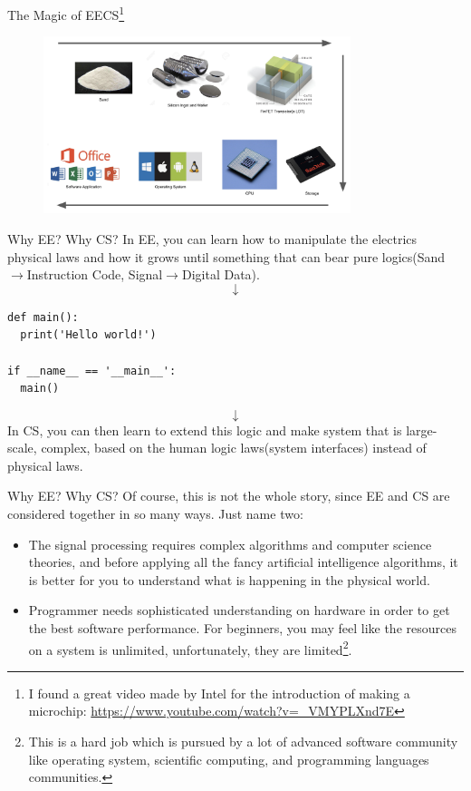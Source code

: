 \documentclass[aspectratio=169, 12pt]{beamer}
\begin{document}
\begin{frame}{The Magic of EECS\footnote{\tiny I found a great video made by Intel for the introduction of making a microchip: \url{https://www.youtube.com/watch?v=_VMYPLXnd7E}}}
    \begin{figure}
        \centering
        \includegraphics[width=0.8\textwidth]{assets/magic.png}
        \label{fig:magic}
    \end{figure}
\end{frame}

\begin{frame}[fragile]{Why EE? Why CS?}
In EE, you can learn how to manipulate the electrics physical laws and how it grows until something that can bear pure logics(Sand$\rightarrow$Instruction Code, Signal$\rightarrow$Digital Data).
$$\downarrow$$
\begin{lstlisting}[upquote=true]
def main():
  print('Hello world!')

if __name__ == '__main__':
  main()
\end{lstlisting}
$$\downarrow$$
In CS, you can then learn to extend this logic and make system that is large-scale, complex, based on the human logic laws(system interfaces) instead of physical laws.
\end{frame}

\begin{frame}{Why EE? Why CS?}
Of course, this is not the whole story, since EE and CS are considered together in so many ways. Just name two:
\begin{itemize}
\item The signal processing requires complex algorithms and computer science theories, and before applying all the fancy artificial intelligence algorithms, it is better for you to understand what is happening in the physical world.
\item Programmer needs sophisticated understanding on hardware in order to get the best software performance. For beginners, you may feel like the resources on a system is unlimited, unfortunately, they are limited\footnote{\tiny This is a hard job which is pursued by a lot of advanced software community like operating system, scientific computing, and programming languages communities.}.
\end{itemize}
\end{frame}
\end{document}
